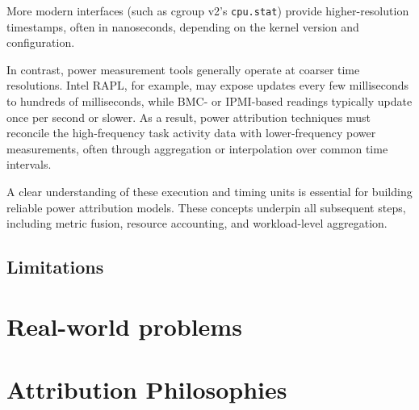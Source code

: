 More modern interfaces (such as cgroup v2’s \texttt{cpu.stat}) provide higher-resolution timestamps, often in nanoseconds, depending on the kernel version and configuration.

In contrast, power measurement tools generally operate at coarser time resolutions. Intel RAPL, for example, may expose updates every few milliseconds to hundreds of milliseconds, while BMC- or IPMI-based readings typically update once per second or slower. As a result, power attribution techniques must reconcile the high-frequency task activity data with lower-frequency power measurements, often through aggregation or interpolation over common time intervals.

A clear understanding of these execution and timing units is essential for building reliable power attribution models. These concepts underpin all subsequent steps, including metric fusion, resource accounting, and workload-level aggregation.

\subsection{Limitations}
\label{ch:limitations}

\section{Real-world problems}
\label{sec:realworld-problems}

\section{Attribution Philosophies}
\label{sec:attribution-philosophies}








